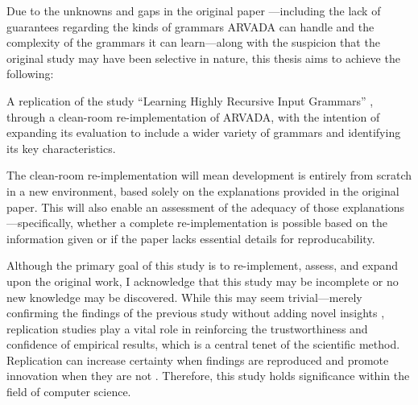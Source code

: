 Due to the unknowns and gaps in the original paper \cite{kulkarniLearningHighlyRecursive2021}—including the lack of guarantees regarding the kinds of grammars ARVADA can handle and the complexity of the grammars it can learn—along with the suspicion that the original study may have been selective in nature, this thesis aims to achieve the following:

\vspace{\baselineskip}
A replication of the study “Learning Highly Recursive Input Grammars” \cite{kulkarniLearningHighlyRecursive2021}, through a clean-room re-implementation of ARVADA, with the intention of expanding its evaluation to include a wider variety of grammars and identifying its key characteristics.

\vspace{\baselineskip}
The clean-room re-implementation will mean development is entirely from scratch in a new environment, based solely on the explanations provided in the original paper. This will also enable an assessment of the adequacy of those explanations—specifically, whether a complete re-implementation is possible based on the information given or if the paper lacks essential details for reproducability.

\vspace{\baselineskip}
Although the primary goal of this study is to re-implement, assess, and expand upon the original work, I acknowledge that this study may be incomplete or no new knowledge may be discovered. While this may seem trivial—merely confirming the findings of the previous study without adding novel insights \cite{hendriksConsiderItParsed}, replication studies play a vital role in reinforcing the trustworthiness and confidence of empirical results, which is a central tenet of the scientific method. Replication can increase certainty when findings are reproduced and promote innovation when they are not \cite{shepperdReplicationStudiesConsidered2018}. Therefore, this study holds significance within the field of computer science.





